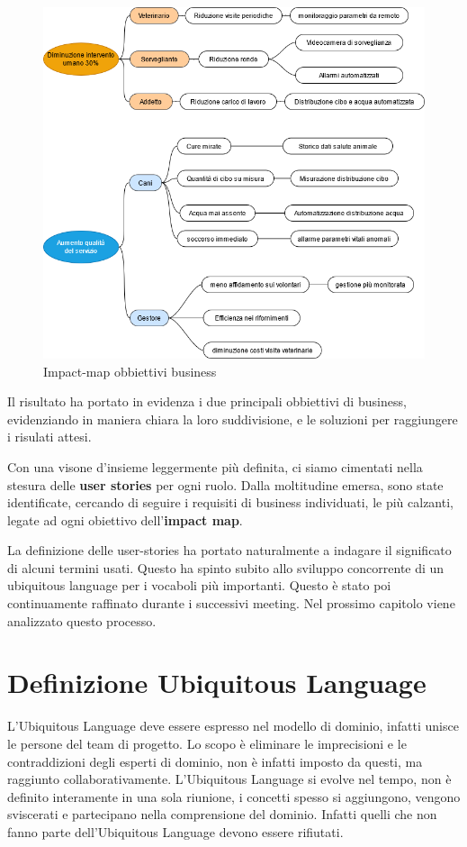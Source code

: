     \begin{figure}[ht]
        \caption{Impact-map obbiettivi business}
        \centering
        \includegraphics[width=1\textwidth]{DrawIo/impactMap.png}
    \end{figure}

    Il risultato ha portato in evidenza i due principali obbiettivi di business, evidenziando in maniera chiara la loro suddivisione, e le soluzioni per raggiungere i risulati attesi.
    
    Con una visone d'insieme leggermente più definita, ci siamo cimentati nella stesura delle \textbf{user stories} per ogni ruolo. Dalla moltitudine emersa, sono state identificate, cercando di seguire i requisiti di business individuati,  le più calzanti, legate ad ogni obiettivo dell'\textbf{impact map}.

	La definizione delle user-stories ha portato naturalmente a indagare il significato di alcuni termini usati. Questo ha spinto subito allo sviluppo concorrente di un ubiquitous language per i vocaboli più importanti. Questo è stato poi continuamente raffinato durante i successivi meeting. 
	Nel prossimo capitolo viene analizzato questo processo. 
    
	\section{Definizione Ubiquitous Language}	
	L'Ubiquitous Language deve essere espresso nel modello di dominio, infatti unisce le persone del team di progetto.
    Lo scopo è eliminare le imprecisioni e le contraddizioni degli esperti di dominio, non è infatti imposto da questi, ma raggiunto collaborativamente.
    L'Ubiquitous Language si evolve nel tempo, non è definito interamente in una sola riunione, i concetti spesso si aggiungono, vengono sviscerati e partecipano nella comprensione del dominio. Infatti quelli che non fanno parte dell'Ubiquitous Language devono essere rifiutati.
    
